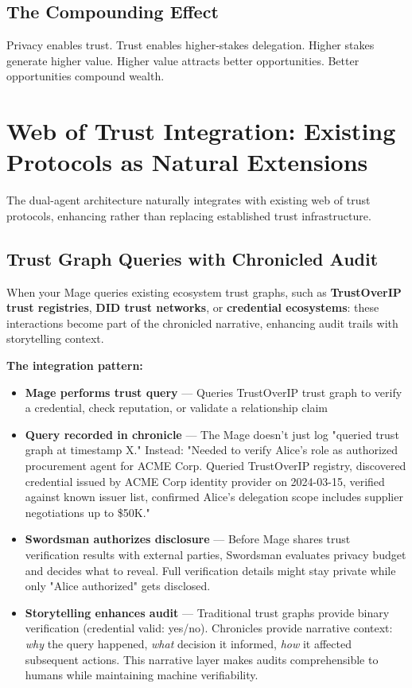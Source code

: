 \documentclass[11pt,a4paper]{article}
\theoremstyle{definition}
\begin{document}
\subsection{The Compounding Effect}

Privacy enables trust. Trust enables higher-stakes delegation. Higher stakes generate higher value. Higher value attracts better opportunities. Better opportunities compound wealth.

\section{Web of Trust Integration: Existing Protocols as Natural Extensions}

The dual-agent architecture naturally integrates with existing web of trust protocols, enhancing rather than replacing established trust infrastructure.

\subsection{Trust Graph Queries with Chronicled Audit}

When your Mage queries existing ecosystem trust graphs, such as \textbf{TrustOverIP trust registries}, \textbf{DID trust networks}, or \textbf{credential ecosystems}: these interactions become part of the chronicled narrative, enhancing audit trails with storytelling context.

\textbf{The integration pattern:}

\begin{itemize}
    \item \textbf{Mage performs trust query} --- Queries TrustOverIP trust graph to verify a credential, check reputation, or validate a relationship claim
    \item \textbf{Query recorded in chronicle} --- The Mage doesn't just log "queried trust graph at timestamp X." Instead: "Needed to verify Alice's role as authorized procurement agent for ACME Corp. Queried TrustOverIP registry, discovered credential issued by ACME Corp identity provider on 2024-03-15, verified against known issuer list, confirmed Alice's delegation scope includes supplier negotiations up to \$50K."
    \item \textbf{Swordsman authorizes disclosure} --- Before Mage shares trust verification results with external parties, Swordsman evaluates privacy budget and decides what to reveal. Full verification details might stay private while only "Alice authorized" gets disclosed.
    \item \textbf{Storytelling enhances audit} --- Traditional trust graphs provide binary verification (credential valid: yes/no). Chronicles provide narrative context: \textit{why} the query happened, \textit{what} decision it informed, \textit{how} it affected subsequent actions. This narrative layer makes audits comprehensible to humans while maintaining machine verifiability.
\end{itemize}
\end{document}
